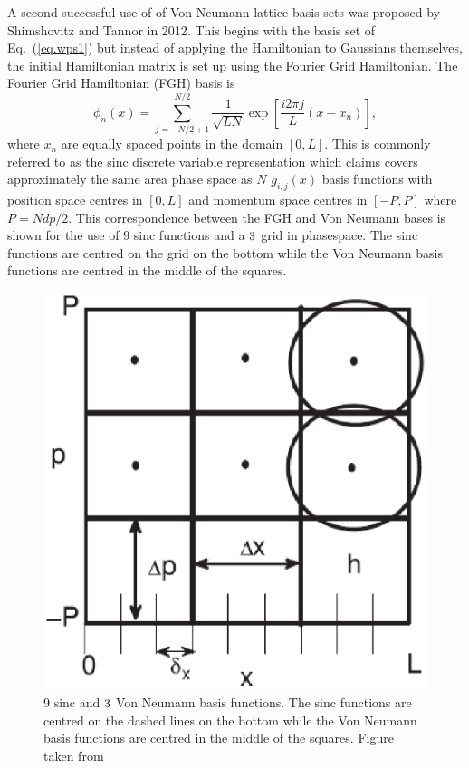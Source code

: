 { 
 A second successful use of of Von Neumann lattice basis sets was proposed by Shimshovitz and Tannor in 2012\cite{Shimshovitz2012}.  This begins with the basis set of Eq.~(\ref{eq.wps1}) but instead of applying the Hamiltonian to Gaussians themselves, the initial Hamiltonian matrix is set up using the Fourier Grid Hamiltonian.  The Fourier Grid Hamiltonian (FGH) basis is
 \begin{equation}\label{eq.four}
\phi_n \left(x\right) = \sum_{j=-N/2+1}^{N/2}\dfrac{1}{\sqrt{LN}} \exp\left[\dfrac{i2 \pi j}{L}\left(x-x_n\right)\right],
 \end{equation}
where $x_n$ are equally spaced points in the domain $[0,L]$.  This is commonly referred to as the sinc discrete variable representation which  claims covers approximately the same area phase space as $N$ $g_{i,j}\left(x\right)$ basis functions with position space centres in $\left[0,L\right]$ and momentum space centres in $\left[-P,P\right]$ where $P=N dp/2$. This correspondence between the FGH and Von Neumann bases is shown for the use of 9 sinc functions and a $3\time3$ grid in phasespace.  The sinc functions are centred on the grid on the bottom while the Von Neumann basis functions are centred in the middle of the squares.
\begin{figure}[!ht]
\begin{center}
\includegraphics[scale=0.5]{shim.eps}
\caption[Pictorial of ST basis functions]{9 sinc and $3\time3$ Von Neumann basis functions. The sinc functions are centred on the dashed lines on the bottom while the Von Neumann basis functions are centred in the middle of the squares. Figure taken from }
\label{fig.r4}
\end{center}
\end{figure}

}
